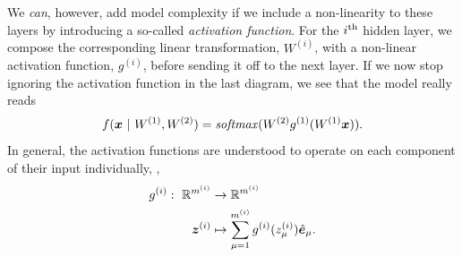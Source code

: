 We \textit{can}, however, add model complexity if we include a non-linearity to these layers by introducing a so-called \textit{activation function}.
For the $i^{\rm th}$ hidden layer, we compose the corresponding linear transformation, $W^{(i)}$, with a non-linear activation function, $g^{(i)}$, before sending it off to the next layer.
If we now stop ignoring the activation function in the last diagram, we see that the model really reads
%
\begin{equation}
    f(\bm{x} ~|~ W^{(1)}, W^{(2)}) = \operatorname*{\text{\textit{softmax}}}(W^{(2)} g^{(1)}(W^{(1)} \bm{x})).
\end{equation}
%
In general, the activation functions are understood to operate on each component of their input individually, \ie,
%
\begin{align}
    g^{(i)}: ~\mathbb{R}^{m^{(i)}}   &\rightarrow \mathbb{R}^{m^{(i)}} \nonumber\\
                   ~\bm{z}^{(i)} &\mapsto \sum_{\mu = 1}^{m^{(i)}} g^{(i)}(z^{(i)}_\mu) \hat{\bm{e}}_\mu.
\end{align}
%
